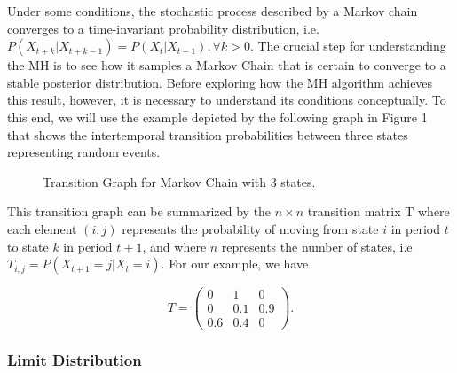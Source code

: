 \documentclass[12pt,english,a4paper,oneside]{article}
\theoremstyle{definition}
\theoremstyle{definition}
\theoremstyle{definition}
\theoremstyle{definition}
\theoremstyle{remark}
\begin{document}
\noindent
Under some conditions, the stochastic process described by a Markov chain converges to a time-invariant probability distribution, i.e.~\(P(X_{t+k} |X_{t+k-1}) = P(X_{t} |X_{t-1}), \forall k>0\). The crucial step for understanding the MH is to see how it samples a Markov Chain that is certain to converge to a stable posterior distribution. Before exploring how the MH algorithm achieves this result, however, it is necessary to understand its conditions conceptually. To this end, we will use the example depicted by the following graph in Figure 1 that shows the intertemporal transition probabilities between three states representing random events.

\begin{figure}[H]
\label{fig:ex1}


\centering


\caption{Transition Graph for Markov Chain with 3 states.}
\end{figure}

\noindent
This transition graph can be summarized by the \(n \times n\) transition matrix T where each element \((i,j)\) represents the probability of moving from state \(i\) in period \(t\) to state \(k\) in period \(t+1\), and where \(n\) represents the number of states, i.e \(T_{i,j} = P(X_{t+1}=j | X_t = i)\). For our example, we have

\begin{equation}
\label{eq:transition-matrix}
T=
\begin{pmatrix}
0 & 1 & 0\\
0 & 0.1 & 0.9\\
0.6 & 0.4 & 0
\end{pmatrix}
.
\end{equation}

\hypertarget{limit-distribution}{%
\subsubsection{Limit Distribution}\label{limit-distribution}}
\end{document}
